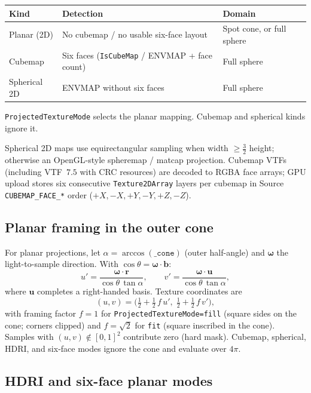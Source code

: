 \documentclass[11pt,a4paper]{article}
\newcommand{\code}[1]{\texttt{#1}}
\newcommand{\vect}[1]{\bm{#1}}
\begin{document}
\begin{center}
\begin{tabular}{@{}lll@{}}
  \toprule
  Kind & Detection & Domain \\
  \midrule
  Planar (2D) & No cubemap / no usable six-face layout & Spot cone, or full sphere \\
  Cubemap & Six faces (\code{IsCubeMap} / ENVMAP + face count) & Full sphere \\
  Spherical 2D & ENVMAP without six faces & Full sphere \\
  \bottomrule
\end{tabular}
\end{center}

\code{ProjectedTextureMode} selects the planar mapping. Cubemap and spherical
kinds ignore it.

Spherical 2D maps use equirectangular sampling when width $\ge\tfrac{3}{2}$ height;
otherwise an OpenGL-style spheremap / matcap projection. Cubemap VTFs (including
VTF~$7.5$ with CRC resources) are decoded to RGBA face arrays; GPU upload stores
six consecutive \code{Texture2DArray} layers per cubemap in Source
\code{CUBEMAP\_FACE\_*} order ($+X,-X,+Y,-Y,+Z,-Z$).

\subsection{Planar framing in the outer cone}

For planar projections, let $\alpha=\arccos(\texttt{\_cone})$ (outer half-angle)
and $\vect{\omega}$ the light-to-sample direction. With $\cos\theta=\vect{\omega}\cdot\vect{b}$:
\begin{equation}
  u'=\frac{\vect{\omega}\cdot\vect{r}}{\cos\theta\,\tan\alpha},
  \qquad
  v'=\frac{\vect{\omega}\cdot\vect{u}}{\cos\theta\,\tan\alpha},
\end{equation}
where $\vect{u}$ completes a right-handed basis. Texture coordinates are
\begin{equation}
  (u,v)=\bigl(\tfrac12+\tfrac12\,f\,u',\;
              \tfrac12+\tfrac12\,f\,v'\bigr),
\end{equation}
with framing factor $f=1$ for \code{ProjectedTextureMode=fill} (square sides on
the cone; corners clipped) and $f=\sqrt{2}$ for \code{fit} (square inscribed in
the cone). Samples with $(u,v)\notin[0,1]^{2}$ contribute zero (hard mask).
Cubemap, spherical, HDRI, and six-face modes ignore the cone and evaluate over $4\pi$.

\subsection{HDRI and six-face planar modes}
\end{document}
